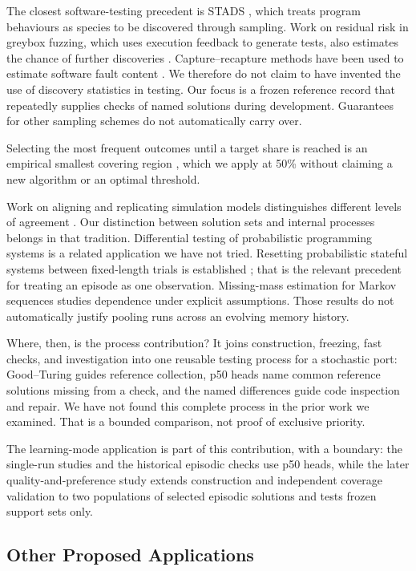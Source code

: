 \documentclass[10pt,letterpaper]{article}
\begin{document}
The closest software-testing precedent is STADS \citep{ref13}, which treats program
behaviours as species to be discovered through sampling. Work on residual risk in greybox
fuzzing, which uses execution feedback to generate tests, also estimates the chance of
further discoveries \citep{ref14}. Capture--recapture methods have been used to estimate
software fault content \citep{ref25}. We therefore do not claim to have invented the use
of discovery statistics in testing. Our focus is a frozen reference record that repeatedly
supplies checks of named solutions during development. Guarantees for other sampling
schemes do not automatically carry over.

Selecting the most frequent outcomes until a target share is reached is an empirical
smallest covering region \citep{ref33}, which we apply at 50\% without claiming a new
algorithm or an optimal threshold.

Work on aligning and replicating simulation models distinguishes different levels of
agreement \citep{ref19, ref20}. Our distinction between solution sets and internal
processes belongs in that tradition. Differential testing of probabilistic programming
systems \citep{ref18} is a related application we have not tried. Resetting probabilistic
stateful systems between fixed-length trials is established \citep{ref34}; that is the
relevant precedent for treating an episode as one observation. Missing-mass estimation for
Markov sequences \citep{ref35} studies dependence under explicit assumptions. Those
results do not automatically justify pooling runs across an evolving memory history.

Where, then, is the process contribution? It joins construction, freezing, fast checks,
and investigation into one reusable testing process for a stochastic port: Good--Turing
guides reference collection, p50 heads name common reference solutions missing from a
check, and the named differences guide code inspection and repair. We have not found this
complete process in the prior work we examined. That is a bounded comparison, not proof of
exclusive priority.

The learning-mode application is part of this contribution, with a boundary: the
single-run studies and the historical episodic checks use p50 heads, while the later
quality-and-preference study extends construction and independent coverage validation to
two populations of selected episodic solutions and tests frozen support sets only.

\subsection{Other Proposed Applications}\label{app:further-applications}
\end{document}
